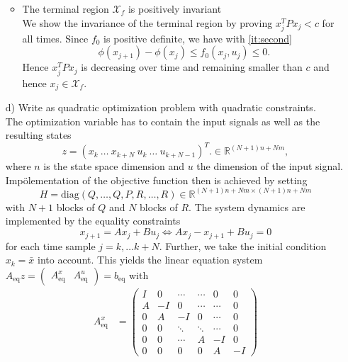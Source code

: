 \documentclass[]{article}
\newcommand{\ind}[2]{{#1}_{\mathrm{#2}}}
\newcommand{\trp}{^T}
\newcommand{\xj}{x_j}
\newcommand{\xjplus}{x_{j+1}}
\newcommand{\xk}{x_k}
\newcommand{\uj}{u_j}
\newcommand{\uk}{u_k}
\newcommand{\Aeq}{\ind{A}{eq}}
\newcommand{\beq}{\ind{b}{eq}}
\newcommand{\Aeqx}{\Aeq^x}
\newcommand{\Aequ}{\Aeq^u}
\newcommand{\xbar}{\bar{x}}
\newcommand{\R}{\mathbb{R}}
\newcommand{\fnull}{f_0}
\newcommand{\X}{\mathcal{X}}
\newcommand{\Xf}{\X_f}
\begin{document}
\begin{enumerate}
\begin{itemize}
					\item The terminal region $ \Xf $ is positively invariant\\
						We show the invariance of the terminal region by proving $ \xj \trp P \xj < c $ for all  times.
						Since $ \fnull  $ is positive definite, we have with \eqref{it:second}
						\[  \phi(x_{j+1}) - \phi(\xj) \leq \fnull(\xj,\uj) \leq 0. \] Hence $ \xj \trp P \xj $ is decreasing over time and remaining smaller than $ c $ and hence $ \xj\in\Xf $.
				\end{itemize}
			\item[d)] Write as quadratic optimization problem with quadratic constraints.\\
					The optimization variable has to contain the input signals as well as the resulting states
					\begin{equation}
						z = (\xk \ \dots \ x_{k+N} \ \uk \ \dots \ u_{k+N-1})\trp. \in \R^{(N+1)n + Nm},
					\end{equation} where $ n $ is the state space dimension and $ u $ the dimension of the input signal.
					Impölementation of the objective function then is achieved by setting
					\begin{equation}
						H = \mathrm{diag}(Q,\dots,Q,P,R,\dots,R) \in \R^{(N+1)n + Nm \times (N+1)n + Nm}
					\end{equation}
					with $ N+1 $ blocks of $ Q $ and $ N $ blocks of $ R $. The system dynamics are implemented by the equality constraints
					\begin{equation}
						\xjplus = A\xj + B\uj \Longleftrightarrow A\xj - \xjplus + B\uj = 0   
					\end{equation}
				for each time sample $ j = k,\dots k+N $.
				Further, we take the initial condition $ \xk= \xbar $ into account. This yields the linear equation system $ \Aeq z = \begin{pmatrix}
					\Aeqx & \Aequ
				\end{pmatrix} = \beq $ with
				\begin{align}
				\Aeqx &=
					\begin{pmatrix}
						I & 0 & \cdots &\cdots & 0 & 0\\
						A & -I & 0 & \cdots & \cdots & 0\\
						0 & A & -I & 0 &\cdots &0\\
						0 & 0 & \ddots & \ddots &\cdots&0\\
						0 & 0&\cdots & A &  -I& 0\\
						0 & 0 & 0 & 0 &  A & -I
					\end{pmatrix}\\

\end{align}
\end{enumerate}
\end{document}
